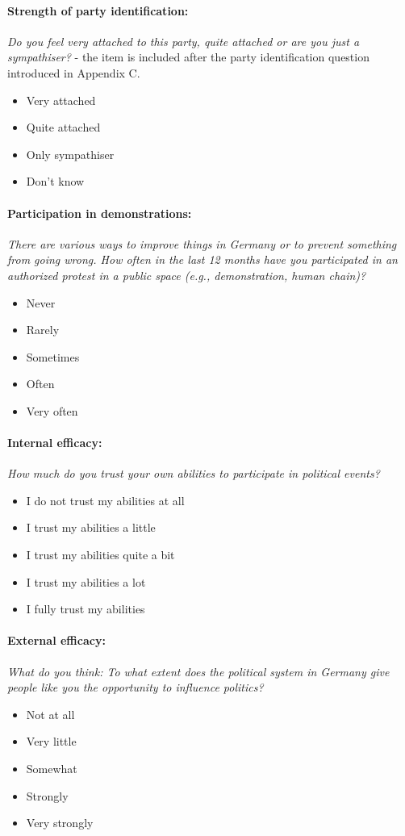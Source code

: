 \documentclass[12pt]{article}
\begin{document}
\paragraph{Strength of party identification:}
\textit{Do you feel very attached to this party, quite attached or are you just a sympathiser?} - the item is included after the party identification question introduced in Appendix C.
\begin{itemize}
\item{Very attached}
\item{Quite attached}
\item{Only sympathiser}
\item{Don't know}
\end{itemize}

\paragraph{Participation in demonstrations:}
\textit{There are various ways to improve things in Germany or to prevent something from going wrong. How often in the last 12 months have you participated in an authorized protest in a public space (e.g., demonstration, human chain)?}
\begin{itemize}
  \item{Never}
  \item{Rarely}
  \item{Sometimes}
  \item{Often}
  \item{Very often}
\end{itemize}

\paragraph{Internal efficacy:}
\textit{How much do you trust your own abilities to participate in political events?}
\begin{itemize}
  \item{I do not trust my abilities at all}
  \item{I trust my abilities a little}
  \item{I trust my abilities quite a bit}
  \item{I trust my abilities a lot}
  \item{I fully trust my abilities}
\end{itemize}

\paragraph{External efficacy:}
\textit{What do you think: To what extent does the political system in Germany give people like you the opportunity to influence politics?}
\begin{itemize}
  \item{Not at all}
  \item{Very little}
  \item{Somewhat}
  \item{Strongly}
  \item{Very strongly}
\end{itemize}
\end{document}
